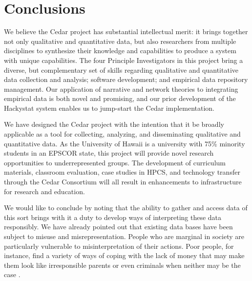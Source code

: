 \section{Conclusions}

We believe the Cedar project has substantial intellectual merit: it brings
together not only qualitative and quantitative data, but also researchers
from multiple disciplines to synthesize their knowledge and capabilities to
produce a system with unique capabilities.  The four Principle
Investigators in this project bring a diverse, but complementary set of
skills regarding qualitative and quantitative data collection and analysis;
software development; and empirical data repository management. Our
application of narrative and network theories to integrating empirical data
is both novel and promising, and our prior development of the Hackystat system 
enables us to jump-start the Cedar implementation.

We have designed the Cedar project with the intention that it be broadly
applicable as a tool for collecting, analyzing, and disseminating
qualitative and quantitative data.  As the University of Hawaii is a
university with 75\% minority students in an EPSCOR state, this project
will provide novel research opportunities to underrepresented groups. 
The development of curriculum materials, classroom evaluation, case studies 
in HPCS, and technology transfer through the Cedar Consortium will all result
in enhancements to infrastructure for research and education. 

We would like to conclude by noting that the ability to gather and access
data of this sort brings with it a duty to develop ways of interpreting
these data responsibly.  We have already pointed out that existing data
bases have been subject to misuse and misrepresentation.  People who are
marginal in society are particularly vulnerable to misinterpretation of
their actions.  Poor people, for instance, find a variety of ways of coping
with the lack of money that may make them look like irresponsible parents
or even criminals when neither may be the case \cite{Crampton01, Edin91,
Stack74}.  

